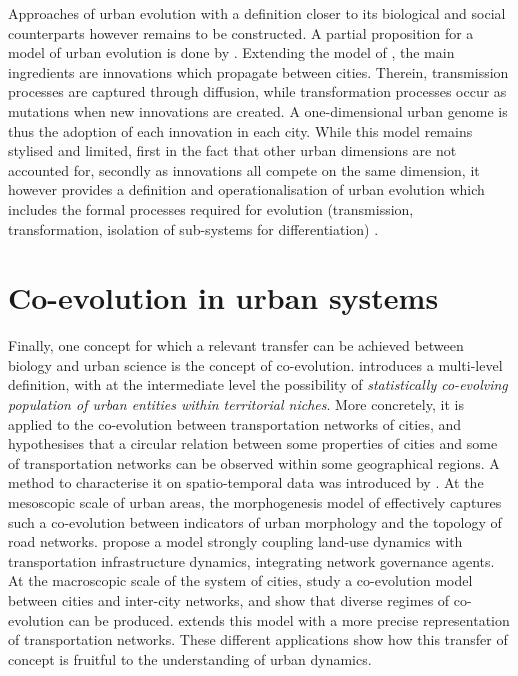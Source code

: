 \documentclass[letterpaper]{article}
\begin{document}
Approaches of urban evolution with a definition closer to its biological and social counterparts however remains to be constructed. A partial proposition for a model of urban evolution is done by \cite{raimbault2020model}. Extending the model of \cite{favaro2011gibrat}, the main ingredients are innovations which propagate between cities. Therein, transmission processes are captured through diffusion, while transformation processes occur as mutations when new innovations are created. A one-dimensional urban genome is thus the adoption of each innovation in each city. While this model remains stylised and limited, first in the fact that other urban dimensions are not accounted for, secondly as innovations all compete on the same dimension, it however provides a definition and operationalisation of urban evolution which includes the formal processes required for evolution (transmission, transformation, isolation of sub-systems for differentiation) \citep{durham1991coevolution}.


\section{Co-evolution in urban systems}


Finally, one concept for which a relevant transfer can be achieved between biology and urban science is the concept of co-evolution. \cite{raimbault2018caracterisation} introduces a multi-level definition, with at the intermediate level the possibility of \emph{statistically co-evolving population of urban entities within territorial niches}. More concretely, it is applied to the co-evolution between transportation networks of cities, and hypothesises that a circular relation between some properties of cities and some of transportation networks can be observed within some geographical regions. A method to characterise it on spatio-temporal data was introduced by \cite{raimbault2017identification}. At the mesoscopic scale of urban areas, the morphogenesis model of \cite{raimbault2019generating} effectively captures such a co-evolution between indicators of urban morphology and the topology of road networks. \cite{le2015modeling} propose a model strongly coupling land-use dynamics with transportation infrastructure dynamics, integrating network governance agents. At the macroscopic scale of the system of cities, \cite{raimbault2018modeling} study a co-evolution model between cities and inter-city networks, and show that diverse regimes of co-evolution can be produced. \cite{raimbault2020hierarchy} extends this model with a more precise representation of transportation networks. These different applications show how this transfer of concept is fruitful to the understanding of urban dynamics.
\end{document}
